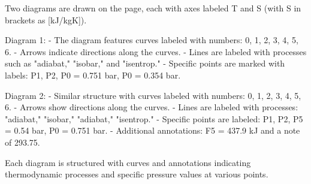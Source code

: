 Two diagrams are drawn on the page, each with axes labeled T and S (with S in brackets as [kJ/kgK]). 

Diagram 1:
- The diagram features curves labeled with numbers: 0, 1, 2, 3, 4, 5, 6.
- Arrows indicate directions along the curves.
- Lines are labeled with processes such as "adiabat," "isobar," and "isentrop."
- Specific points are marked with labels: P1, P2, P0 = 0.751 bar, P0 = 0.354 bar.

Diagram 2:
- Similar structure with curves labeled with numbers: 0, 1, 2, 3, 4, 5, 6.
- Arrows show directions along the curves.
- Lines are labeled with processes: "adiabat," "isobar," "adiabat," "isentrop."
- Specific points are labeled: P1, P2, P5 = 0.54 bar, P0 = 0.751 bar.
- Additional annotations: F5 = 437.9 kJ and a note of 293.75.

Each diagram is structured with curves and annotations indicating thermodynamic processes and specific pressure values at various points.